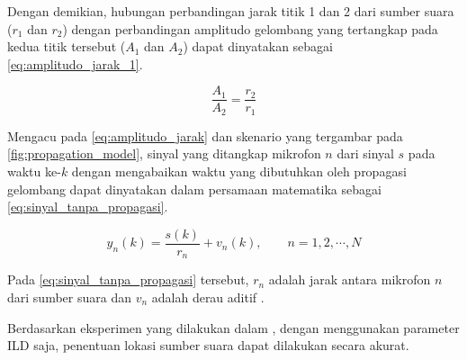 Dengan demikian, hubungan perbandingan jarak titik 1 dan 2 dari sumber suara ($r_1$ dan $r_2$) dengan perbandingan amplitudo gelombang yang tertangkap pada kedua titik tersebut ($A_1$ dan $A_2$) dapat dinyatakan sebagai \autoref{eq:amplitudo_jarak_1}.

\begin{equation} \label{eq:amplitudo_jarak_1}
\frac{A_1}{A_2} = \frac{r_2}{r_1}
\end{equation}

Mengacu pada \autoref{eq:amplitudo_jarak} dan skenario yang tergambar pada \autoref{fig:propagation_model}, sinyal yang ditangkap mikrofon $n$ dari sinyal $s$ pada waktu ke-$k$ dengan mengabaikan waktu yang dibutuhkan oleh propagasi gelombang dapat dinyatakan dalam persamaan matematika sebagai \autoref{eq:sinyal_tanpa_propagasi}.

\begin{equation} \label{eq:sinyal_tanpa_propagasi}
y_{n}(k) = \frac{s(k)}{r_n} + v_{n}(k), \qquad n = 1, 2, \cdots, N
\end{equation}

Pada \autoref{eq:sinyal_tanpa_propagasi} tersebut, $r_{n}$ adalah jarak antara mikrofon $n$ dari sumber suara dan $v_{n}$ adalah derau aditif \cite{birchfield2005}.

Berdasarkan eksperimen yang dilakukan dalam \cite{birchfield2005}, dengan menggunakan parameter ILD saja, penentuan lokasi sumber suara dapat dilakukan secara akurat.